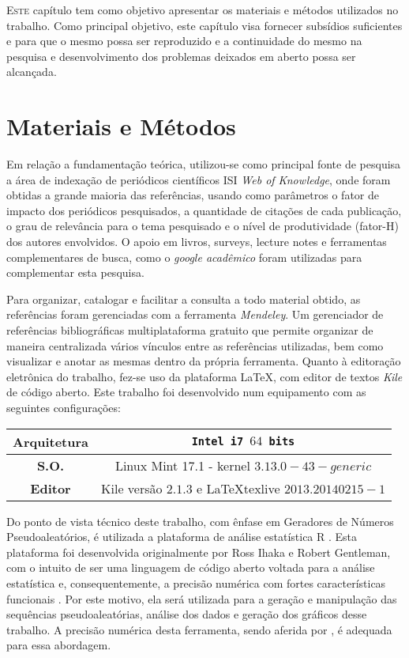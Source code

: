 
  \lettrine{E}{ste} capítulo tem como objetivo apresentar os materiais e métodos utilizados no trabalho. Como principal objetivo, este capítulo visa fornecer subsídios suficientes e para que o mesmo possa ser reproduzido e a continuidade do mesmo na pesquisa e desenvolvimento dos problemas deixados em aberto possa ser alcançada.

\section{Materiais e Métodos}

	Em relação a fundamentação teórica, utilizou-se como principal fonte de pesquisa a área de indexação de periódicos científicos ISI \emph{Web of Knowledge}, onde foram obtidas a grande maioria das referências, usando como parâmetros o fator de impacto dos periódicos pesquisados, a quantidade de citações de cada publicação, o grau de relevância para o tema pesquisado e o nível de produtividade (fator-H) dos autores envolvidos. O apoio em livros, surveys, lecture notes e ferramentas complementares de busca, como o \emph{google acadêmico} foram utilizadas para complementar esta pesquisa.

  Para organizar, catalogar e facilitar a consulta a todo material obtido, as referências foram gerenciadas com a ferramenta \emph{Mendeley}. Um gerenciador de referências bibliográficas multiplataforma gratuito que permite organizar de maneira centralizada vários vínculos entre as referências utilizadas, bem como visualizar e anotar as mesmas dentro da própria ferramenta. Quanto à editoração eletrônica do trabalho, fez-se uso da plataforma \LaTeX, com editor de textos \emph{Kile} de código aberto. Este trabalho foi desenvolvido num equipamento com as seguintes configurações:

\begin{center}
\begin{tabular}{c||c}
\hline
\textbf{Arquitetura} & \texttt{Intel i7 $64$ bits}\\
\hline
\textbf{S.O.} & Linux Mint 17.1 - kernel $3.13.0-43-generic$\\
\hline
\textbf{Editor} & Kile versão $2.1.3$ e \LaTeX texlive $2013.20140215-1$\\
\hline
\end{tabular}
\end{center}

  Do ponto de vista técnico deste trabalho, com ênfase em Geradores de Números Pseudoaleatórios, é utilizada a plataforma de análise estatística R . Esta plataforma foi desenvolvida originalmente por Ross Ihaka e Robert Gentleman, com o intuito de ser uma linguagem de código aberto voltada para a análise estatística e, consequentemente, a precisão numérica com fortes características funcionais \citep{R}. Por este motivo, ela será utilizada para a geração e manipulação das sequências pseudoaleatórias, análise dos dados e geração dos gráficos desse trabalho. A precisão numérica desta ferramenta, sendo aferida por \citet{Almiron2009}, é adequada para essa abordagem.

